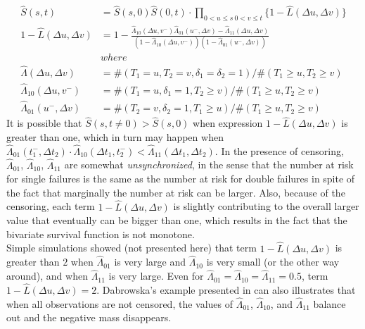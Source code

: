 \documentclass[]{article}
\begin{document}
	$$
	\begin{aligned}
		\hat{S}(s,t) &= \hat{S}(s,0)\hat{S}(0,t)\cdot \prod_{{0<u\leq s~0<v\leq t}}\{1 - \hat{L}(\Delta u, \Delta v)\}\\
    1 - \hat{L}(\Delta u, \Delta v) &= 1 - \frac{\hat{\Lambda}_{10}(\Delta u,v^-)\hat{\Lambda}_{01}(u^-,\Delta v) - \hat{\Lambda}_{11}(\Delta u,\Delta v)}{\left(1-\hat{\Lambda}_{10}(\Delta u,v^-)\right)\left(1-\hat{\Lambda}_{01}(u^-,\Delta v)\right)}\\
  &where\\
	\hat{\Lambda}(\Delta u, \Delta v) &= \#(T_1=u, T_2=v, \delta_1=\delta_2=1)/\#(T_1\geq u, T_2\geq v)\\
	\hat{\Lambda}_{10}(\Delta u, v^-) &= \#(T_1=u, \delta_1=1, T_2\geq v)/\#(T_1\geq u, T_2\geq v)\\
	\hat{\Lambda}_{01}(u^-,\Delta  v) &= \#(T_2=v, \delta_2=1, T_1\geq u)/\#(T_1\geq u, T_2\geq v)
	\end{aligned}
	$$
It is possible that $\hat{S}(s,t\neq 0) > \hat{S}(s,0)$ when expression $1 - \hat{L}(\Delta u, \Delta v)$ is greater than one, which in turn may happen when  $\hat{\Lambda}_{01}(t_1^-,\Delta  t_2) \cdot \hat{\Lambda}_{10}(\Delta t_1, t_2^-)< \hat{\Lambda}_{11}(\Delta t_1, \Delta t_2)$. In the presence of censoring, $\hat{\Lambda}_{01}$, $\hat{\Lambda}_{10}$, $\hat{\Lambda}_{11}$ are somewhat \emph{unsynchronized}, in the sense that the number at risk for single failures is the same as the number at risk for double failures in spite of the fact that marginally the number at risk can be larger. Also, because of the censoring, each term $1 - \hat{L}(\Delta u, \Delta v)$ is slightly contributing to the overall larger value that eventually can be bigger than one, which results in the fact that the bivariate survival function is not monotone.\\

Simple simulations showed (not presented here) that term $1 - \hat{L}(\Delta u, \Delta v)$ is greater than $2$ when $\hat{\Lambda}_{01}$ is very large and $\hat{\Lambda}_{10}$ is very small (or the other way around), and when $\hat{\Lambda}_{11}$ is very large. Even for $\hat{\Lambda}_{01} = \hat{\Lambda}_{10} = \hat{\Lambda}_{11} = 0.5$, term $1 - \hat{L}(\Delta u, \Delta v) = 2$.  Dabrowska's example presented in  can also illustrates that when all observations are not censored, the values of $\hat{\Lambda}_{01}$, $\hat{\Lambda}_{10}$, and $\hat{\Lambda}_{11}$ balance out and the negative mass disappears.\\
\end{document}
